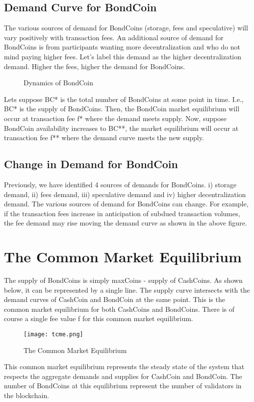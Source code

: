 \subsection{Demand Curve for BondCoin}

The various sources of demand for BondCoins (storage, fees and speculative) will vary positively with transaction fees. An additional source of demand for BondCoins is from participants wanting more decentralization and who do not mind paying higher fees. Let’s label this demand as the higher decentralization demand. Higher the fees, higher the demand for BondCoins.

\begin{figure} [!htbp]
\centering    
{}
\caption{Dynamics of BondCoin}
\end{figure}

Lets suppose BC* is the total number of BondCoins at some point in time. I.e., BC* is the supply of BondCoins. Then, the BondCoin market equilibrium will occur at transaction fee f* where the demand meets supply. Now, suppose BondCoin availability increases to BC**, the market equilibrium will occur at transaction fee f** where the demand curve meets the new supply.

\subsection{Change in Demand for BondCoin}

Previously, we have identified 4 sources of demands for BondCoins. i) storage demand, ii) fees demand, iii) speculative demand and iv) higher decentralization demand. The various sources of demand for BondCoins can change. For example, if the transaction fees increase in anticipation of subdued transaction volumes, the fee demand may rise moving the demand curve as shown in the above figure.

\section{The Common Market Equilibrium}

The supply of BondCoins is simply maxCoins - supply of CashCoins. As shown below, it can be represented by a single line. The supply curve intersects with the demand curves of CashCoin and BondCoin at the same point. This is the common market equilibrium for both CashCoins and BondCoins. There is of course a single fee value f for this common market equilibrium.

\begin{figure}[!htbp]
\centering
\texttt{[image: tcme.png]}
\caption{The Common Market Equilibrium}
\label{fig35}
\end{figure}

This common market equilibrium represents the steady state of the system that respects the aggregate demands and supplies for CashCoin and BondCoin. The number of BondCoins at this equilibrium represent the number of validators in the blockchain.